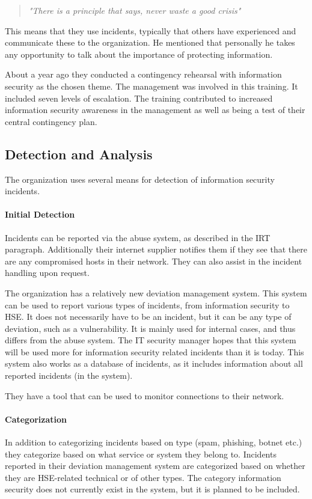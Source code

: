 \begin{quote}
\textit{"There is a principle that says, never waste a good crisis"}
\end{quote}

This means that they use incidents, typically that others have experienced and communicate these to the organization. He mentioned that personally he takes any opportunity to talk about the importance of protecting information.

About a year ago they conducted a contingency rehearsal with information security as the chosen theme. The management was involved in this training. It included seven levels of escalation. The training contributed to increased information security awareness in the management as well as being a test of their central contingency plan.

\subsection{Detection and Analysis}
The organization uses several means for detection of information security incidents.

\paragraph{Initial Detection}
Incidents can be reported via the abuse system, as described in the \ac{IRT} paragraph. Additionally their internet supplier notifies them if they see that there are any compromised hosts in their network. They can also assist in the incident handling upon request.

The organization has a relatively new deviation management system. This system can be used to report various types of incidents, from information security to \ac{HSE}. It does not necessarily have to be an incident, but it can be any type of deviation, such as a vulnerability. It is mainly used for internal cases, and thus differs from the abuse system. The IT security manager hopes that this system will be used more for information security related incidents than it is today. This system also works as a database of incidents, as it includes information about all reported incidents (in the system).  

They have a tool that can be used to monitor connections to their network.

\paragraph{Categorization}
In addition to categorizing incidents based on type (spam, phishing, botnet etc.) they categorize based on what service or system they belong to. Incidents reported in their deviation management system are categorized based on whether they are \ac{HSE}-related technical or of other types. The category information security does not currently exist in the system, but it is planned to be included.

